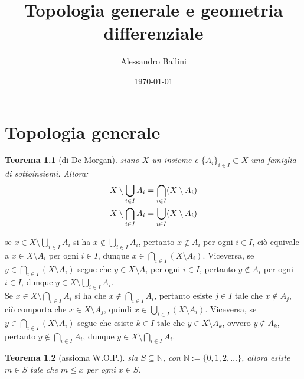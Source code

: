 \documentclass[oneside, 11pt]{amsbook}
\makeatletter
\newcommand{\0}{{(0)}}
\newcommand{\3}{{(3)}}
\theoremstyle{colonplain}
\newtheorem{thm}{Teorema}[chapter]
\theoremstyle{colondefinition}
\theoremstyle{colonremark}
\numberwithin{equation}{chapter}
\renewcommand{\proofname}{Dimostrazione}
\renewenvironment{proof}[1][\proofname]{\par
  \pushQED{\qed}%
  \normalfont \topsep6\p@\@plus6\p@\relax
  \trivlist
  \item[\hskip\labelsep\bfseries #1:]\ignorespaces
}{%
  \popQED\endtrivlist\@endpefalse
}
\makeatother
\begin{document}
\date{\today}
\author{Alessandro Ballini}


\title{Topologia generale e geometria differenziale}

\maketitle
\tableofcontents

\chapter{Topologia generale}
\begin{thm}[di De Morgan]\label{DeMorg} 
    siano $X$ un insieme e $\{ A_i \}_{i \in I} \subset X$ una famiglia di sottoinsiemi. Allora:
    \begin{align}
        X \setminus \bigcup_{i \in I} A_i = \bigcap_{i \in I} (X \setminus A_i) \notag \\
        X \setminus \bigcap_{i \in I} A_i = \bigcup_{i \in I} (X \setminus A_i) \notag
    \end{align}
\end{thm}

\begin{proof}
    se $x \in X \setminus \bigcup_{i \in I} A_i$ si ha $x \not\in \bigcup_{i \in I} A_i$, pertanto $x \not\in A_i$ per ogni $i \in I$, ciò equivale a $x \in X \setminus A_i$ per ogni $i \in I$, dunque $x \in \bigcap_{i \in I} (X \setminus A_i)$. Viceversa, se $y \in \bigcap_{i \in I} (X \setminus A_i)$ segue che $y \in X \setminus A_i$ per ogni $i \in I$, pertanto $y \not\in A_i$ per ogni $i \in I$, dunque $y \in X \setminus \bigcup_{i \in I} A_i$. \\
    Se $x \in X \setminus \bigcap_{i \in I} A_i$ si ha che $x \not\in \bigcap_{i \in I} A_i$, pertanto esiste $j \in I$ tale che $x \not\in A_j$, ciò comporta che $x \in X \setminus A_j$, quindi $x \in \bigcup_{i \in I} (X \setminus A_i)$. Viceversa, se $y \in \bigcap_{i \in I} (X \setminus A_i)$ segue che esiste $k \in I$ tale che $y \in X \setminus A_k$, ovvero $y \not\in A_k$, pertanto $y \not\in \bigcap_{i \in I} A_i$, dunque $y \in X \setminus \bigcap_{i \in I} A_i$.
\end{proof}
\begin{thm}[assioma W.O.P.]\label{WOP}
    sia $S \subseteq \mathbb{N}$, con $\mathbb{N} := \{0, 1, 2, \dots\}$, allora esiste $m \in S$ tale che $m \leq x$ per ogni $x \in S$.
\end{thm}
\end{document}
